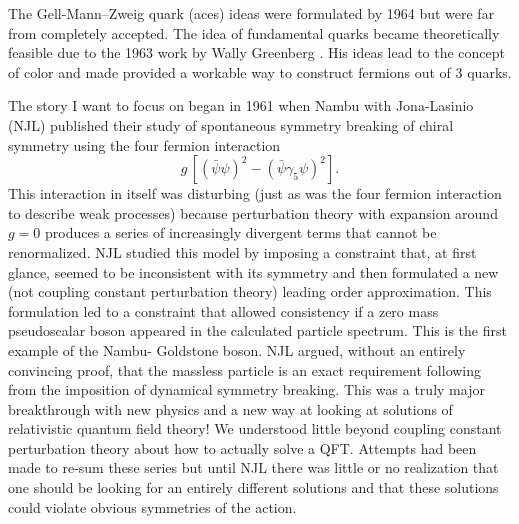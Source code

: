 \documentclass[letterpaper,twoside,preprintnumbers,slac_one]{revtex4}
\begin{document}
The Gell-Mann--Zweig quark (aces) ideas were formulated by 1964
\cite{gm;1964,gz;1964} but were far from completely accepted. The idea
of fundamental quarks became theoretically feasible due to the 1963
work by Wally Greenberg \cite{wag;1964}. His ideas lead to the concept
of color and made provided a workable way to construct fermions out of
3 quarks.

The story I want to focus on began in 1961 when Nambu with
Jona-Lasinio (NJL)  published \cite{nb;1960,nb;1961} their study of
spontaneous symmetry breaking of chiral symmetry using the four fermion
interaction
\begin{equation*}
  g\, \left[ (\bar{\psi}\psi)^2 - (\bar{\psi}\gamma_{5}\psi)^2 \right].
\end{equation*}
This interaction in itself was disturbing (just as was the four
fermion interaction to describe weak processes) because perturbation
theory with expansion around $g=0$ produces a series of increasingly
divergent terms that cannot be renormalized. NJL studied this model by
imposing a constraint that, at first glance, seemed to be inconsistent
with its symmetry and then formulated a new (not coupling constant
perturbation theory) leading order approximation. This formulation led
to a constraint that allowed consistency if a zero mass pseudoscalar
boson appeared in the calculated particle spectrum. This is the first
example of the Nambu- Goldstone boson.  NJL argued, without an
entirely convincing proof, that the massless particle is an exact
requirement following from the imposition of dynamical symmetry
breaking. This was a truly major breakthrough with new physics and a
new way at looking at solutions of relativistic quantum field theory!
We understood little beyond coupling constant perturbation theory
about how to actually solve a QFT. Attempts had been made to re-sum
these series but until NJL there was little or no realization that one
should be looking for an entirely different solutions and that these solutions could violate
obvious symmetries of the action.
\end{document}
